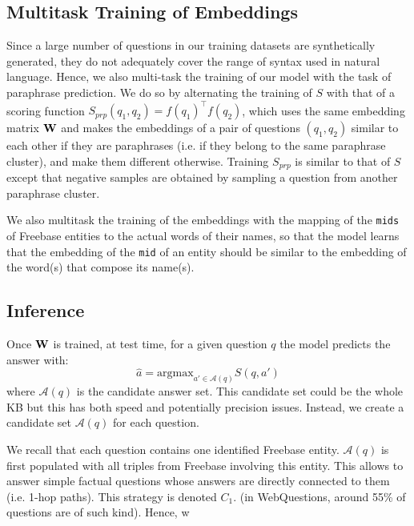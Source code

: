 \documentclass[runningheads,a4paper]{llncs}
\newcommand{\fb}{{\sc Freebase}\xspace}
\newcommand{\wq}{{\sc WebQuestions}\xspace}
\newcommand{\ent}[1]{{\small {\tt #1}}}
\begin{document}
\subsection{Multitask Training of Embeddings}
Since a large number of questions in our training datasets are
synthetically generated, they do not adequately
cover the range of syntax used in natural language.
Hence, we also multi-task the training of our model 
with the task of paraphrase prediction. 
We do so by alternating the training of $S$ with that of a scoring
function $S_{prp}(q_1, q_2) = f(q_1)^\top f(q_2)$, which uses the same
embedding matrix ${\bf W}$ and makes the embeddings of a pair of questions
$(q_1, q_2)$ similar to each other if they are paraphrases (i.e. if
they belong to the same paraphrase cluster), and make them different
otherwise. 
Training $S_{prp}$ is similar to that of $S$ except that negative samples are 
obtained by sampling a question from another paraphrase cluster.



We also multitask the training of the embeddings with the
mapping of the \ent{mids} of \fb entities to the actual words of their
names, so that the model learns that the embedding
of the \ent{mid} of an entity should be similar to the embedding of the
word(s) that compose its name(s).




\subsection{Inference} \label{inference} \label{multiple-ans}
Once ${\bf W}$ is trained, at test time, for a given
question $q$ the model predicts the answer with:
\begin{equation}\label{eq:inf}
\hat{a} = {\mbox{argmax}}_{a' \in \mathcal{A}(q)} S(q,a')
\end{equation}
where $ \mathcal{A}(q)$ is the candidate answer set.
This candidate set could be the whole KB but this has both speed and
potentially precision issues. Instead, we create a candidate set 
$\mathcal{A}(q)$ for each question. 

We recall that each question contains
one identified \fb entity.
$\mathcal{A}(q)$ is first populated with all triples from \fb
involving this entity. This allows to answer simple factual questions
whose answers are directly connected to them (i.e. 1-hop paths). This
strategy is denoted $C_1$.
 (in \wq, around 55\% of questions are of such kind). Hence, w \fi
\end{document}
